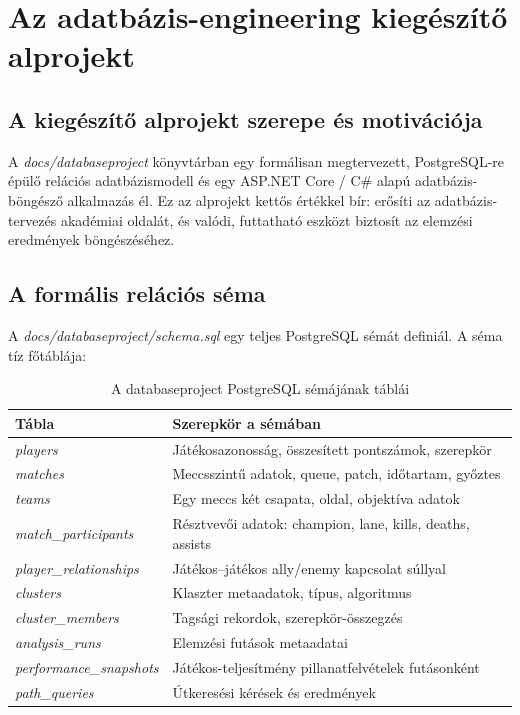 \chapter{Az adatbázis-engineering kiegészítő alprojekt}

\section{A kiegészítő alprojekt szerepe és motivációja}

A \textit{docs/databaseproject} könyvtárban egy formálisan megtervezett, PostgreSQL-re épülő relációs adatbázismodell és egy ASP.NET Core / C\# alapú adatbázis-böngésző alkalmazás él. Ez az alprojekt kettős értékkel bír: erősíti az adatbázis-tervezés akadémiai oldalát, és valódi, futtatható eszközt biztosít az elemzési eredmények böngészéséhez.

\section{A formális relációs séma}

A \textit{docs/databaseproject/schema.sql} egy teljes PostgreSQL sémát definiál. A séma tíz főtáblája:

\begin{table}[H]
\centering
\caption{A databaseproject PostgreSQL sémájának táblái}
\begin{tabularx}{\textwidth}{>{\raggedright\arraybackslash}p{4.5cm}X}
\toprule
\textbf{Tábla} & \textbf{Szerepkör a sémában} \\
\midrule
\textit{players} & Játékosazonosság, összesített pontszámok, szerepkör \\
\textit{matches} & Meccsszintű adatok, queue, patch, időtartam, győztes \\
\textit{teams} & Egy meccs két csapata, oldal, objektíva adatok \\
\textit{match\_participants} & Résztvevői adatok: champion, lane, kills, deaths, assists \\
\textit{player\_relationships} & Játékos--játékos ally/enemy kapcsolat súllyal \\
\textit{clusters} & Klaszter metaadatok, típus, algoritmus \\
\textit{cluster\_members} & Tagsági rekordok, szerepkör-összegzés \\
\textit{analysis\_runs} & Elemzési futások metaadatai \\
\textit{performance\_snapshots} & Játékos-teljesítmény pillanatfelvételek futásonként \\
\textit{path\_queries} & Útkeresési kérések és eredmények \\
\bottomrule
\end{tabularx}
\end{table}

